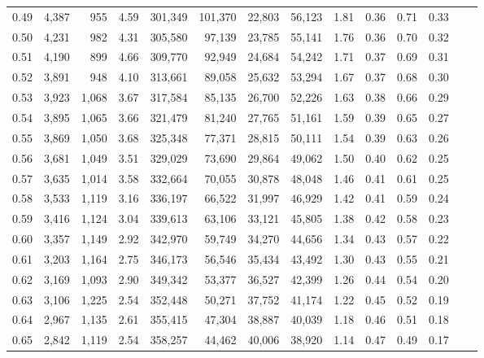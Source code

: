 \begin{tabular}{rrrrrrrrrrrrrr}
0.49 &  4,387 &    955 &    4.59 &  301,349 &  101,370 &  22,803 &  56,123 &  1.81 &  0.36 &  0.71 &      0.33 \\
0.50 &  4,231 &    982 &    4.31 &  305,580 &   97,139 &  23,785 &  55,141 &  1.76 &  0.36 &  0.70 &      0.32 \\
0.51 &  4,190 &    899 &    4.66 &  309,770 &   92,949 &  24,684 &  54,242 &  1.71 &  0.37 &  0.69 &      0.31 \\
0.52 &  3,891 &    948 &    4.10 &  313,661 &   89,058 &  25,632 &  53,294 &  1.67 &  0.37 &  0.68 &      0.30 \\
0.53 &  3,923 &  1,068 &    3.67 &  317,584 &   85,135 &  26,700 &  52,226 &  1.63 &  0.38 &  0.66 &      0.29 \\
0.54 &  3,895 &  1,065 &    3.66 &  321,479 &   81,240 &  27,765 &  51,161 &  1.59 &  0.39 &  0.65 &      0.27 \\
0.55 &  3,869 &  1,050 &    3.68 &  325,348 &   77,371 &  28,815 &  50,111 &  1.54 &  0.39 &  0.63 &      0.26 \\
0.56 &  3,681 &  1,049 &    3.51 &  329,029 &   73,690 &  29,864 &  49,062 &  1.50 &  0.40 &  0.62 &      0.25 \\
0.57 &  3,635 &  1,014 &    3.58 &  332,664 &   70,055 &  30,878 &  48,048 &  1.46 &  0.41 &  0.61 &      0.25 \\
0.58 &  3,533 &  1,119 &    3.16 &  336,197 &   66,522 &  31,997 &  46,929 &  1.42 &  0.41 &  0.59 &      0.24 \\
0.59 &  3,416 &  1,124 &    3.04 &  339,613 &   63,106 &  33,121 &  45,805 &  1.38 &  0.42 &  0.58 &      0.23 \\
0.60 &  3,357 &  1,149 &    2.92 &  342,970 &   59,749 &  34,270 &  44,656 &  1.34 &  0.43 &  0.57 &      0.22 \\
0.61 &  3,203 &  1,164 &    2.75 &  346,173 &   56,546 &  35,434 &  43,492 &  1.30 &  0.43 &  0.55 &      0.21 \\
0.62 &  3,169 &  1,093 &    2.90 &  349,342 &   53,377 &  36,527 &  42,399 &  1.26 &  0.44 &  0.54 &      0.20 \\
0.63 &  3,106 &  1,225 &    2.54 &  352,448 &   50,271 &  37,752 &  41,174 &  1.22 &  0.45 &  0.52 &      0.19 \\
0.64 &  2,967 &  1,135 &    2.61 &  355,415 &   47,304 &  38,887 &  40,039 &  1.18 &  0.46 &  0.51 &      0.18 \\
0.65 &  2,842 &  1,119 &    2.54 &  358,257 &   44,462 &  40,006 &  38,920 &  1.14 &  0.47 &  0.49 &      0.17 \\

\end{tabular}
